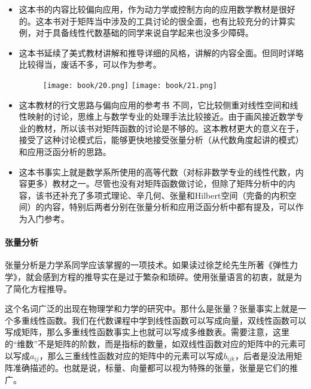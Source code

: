 \begin{itemize}
    \item \textcite[矩阵分析]{史荣昌2010}

          这本书的内容比较偏向应用，作为动力学或控制方向的应用数学教材是很好的。这本书对于矩阵当中涉及的工具讨论的很全面，也有比较充分的计算实例，对于具备线性代数基础的同学来说自学起来也没多少障碍。

    \item \textcite[线性代数高级教程——矩阵理论及应用]{线性代数高级教程}

          这本书延续了美式教材讲解和推导详细的风格，讲解的内容全面。但同时详略比较得当，废话不多，可以作为参考。

          \begin{figure}[h]
              \centering
              \texttt{[image: book/20.png]} \quad
              \texttt{[image: book/21.png]}
          \end{figure}

    \item \textcite[线性代数应该这样学]{阿克斯勒杜现昆2016线性代数应该这样学}

          这本教材的行文思路与偏向应用的参考书 \textcite[矩阵分析]{史荣昌2010} 不同，它比较侧重对线性空间和线性映射的讨论，思维上与数学专业的处理手法比较接近。由于画风接近数学专业的教材，所以该书对矩阵函数的讨论是不够的。这本教材更大的意义在于，接受了这种讨论模式后，能够更快地接受张量分析（从代数角度起讲的模式）和应用泛函分析的思路。

    \item \textcite[高等代数学]{张贤科2004高等代数学}

          这本书事实上就是数学系所使用的高等代数（对标非数学专业的线性代数，内容更多）教材之一。尽管也没有对矩阵函数做讨论，但除了矩阵分析中的内容，该书还补充了多项式理论、辛几何、张量和Hilbert空间（完备的内积空间）的内容，特别后两者分别在张量分析和应用泛函分析中都有提及，可以作为入门参考。
\end{itemize}

\paragraph{张量分析}

张量分析是力学系同学应该掌握的一项技术。如果读过徐芝纶先生所著《弹性力学》，就会感到方程的推导实在是过于繁杂和琐碎。使用张量语言的初衷，就是为了简化方程推导。

这个名词广泛的出现在物理学和力学的研究中。那什么是张量？张量事实上就是一个多重线性函数。我们在代数课程中学到线性函数可以写成向量，双线性函数可以写成矩阵，那么多重线性函数事实上也就可以写成多维数表。需要注意，这里的“维数”不是矩阵的阶数，而是指标的数量，如双线性函数对应的矩阵中的元素可以写成$a_{ij}$，那么三重线性函数对应的矩阵中的元素可以写成$b_{ijk}$，后者是没法用矩阵准确描述的。也就是说，标量、向量都可以视为特殊的张量，张量是它们的推广。

